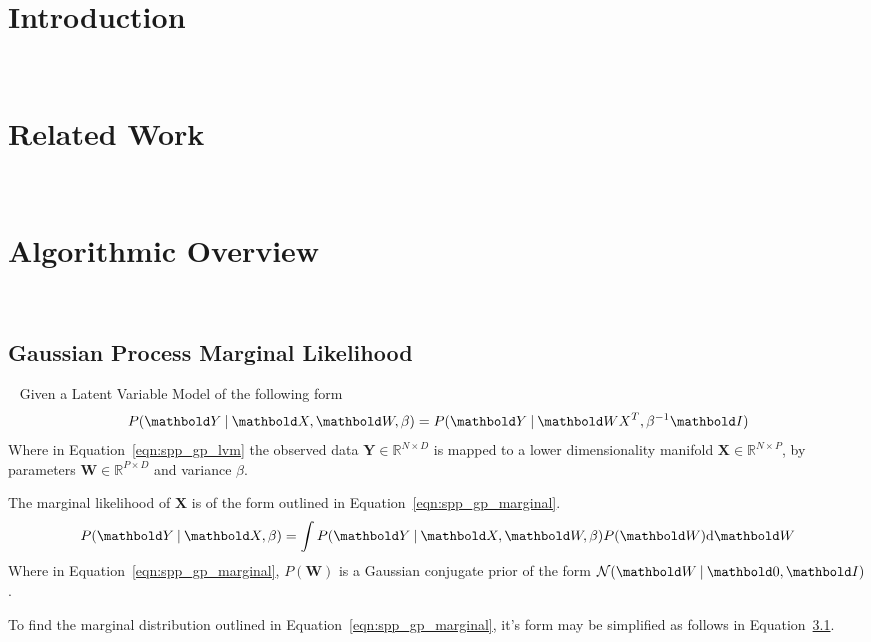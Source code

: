 \section{Introduction}
~\label{sec:spp_introduction}
% 

\section{Related Work}
~\label{sec:spp_related}

\section{Algorithmic Overview}
~\label{sec:spp_algorithm}
\subsection{Gaussian Process Marginal Likelihood}
~\label{subsec:spp_gp_marginal_likelihood}
Given a Latent Variable Model of the following form
\begin{equation}
  \label{eqn:spp_gp_lvm}
  P(\bm{Y} \given \bm{X}, \bm{W}, \beta) = P(\bm{Y} \given \bm{WX}^{T}, \beta^{-1}\bm{I})
\end{equation}
Where in Equation~\ref{eqn:spp_gp_lvm} the observed data \(\bm{Y} \in \mathbb{R}^{N \times D}\) 
is mapped to a lower dimensionality manifold \(\bm{X} \in \mathbb{R}^{N \times P}\), by parameters 
\(\bm{W} \in \mathbb{R}^{P \times D}\) and variance \( \beta \).

The marginal likelihood of \(\bm{X}\) is of the form outlined in Equation~\ref{eqn:spp_gp_marginal}.
\begin{equation}
  \label{eqn:spp_gp_marginal}
  P(\bm{Y} \given \bm{X}, \beta) = \int P(\bm{Y} \given \bm{X}, \bm{W}, \beta) P(\bm{W}) \intd{\bm{W}}
\end{equation}
Where in Equation~\ref{eqn:spp_gp_marginal}, \(P(\bm{W})\) is a Gaussian conjugate prior of the 
form \(\mathcal{N}(\bm{W} \given \bm{0}, \bm{I})\).

To find the marginal distribution outlined in Equation~\ref{eqn:spp_gp_marginal}, it's form may 
be simplified as follows in Equation~\ref{}.

